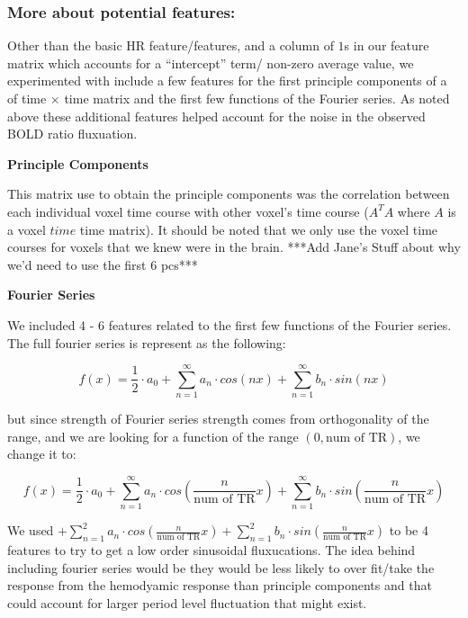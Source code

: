 \subsubsection{More about potential features:}
\par Other than the basic HR feature/features, and a column of $1$s in our feature matrix
which accounts for a ``intercept'' term/ non-zero average value, we experimented with 
include a few features for the first principle components of a of time $\times$ time 
matrix and the first few functions of the Fourier series.  As noted above these 
additional features helped account for the noise in the observed BOLD ratio 
fluxuation.

\vspace{2mm}
\textbf{Principle Components}
\vspace{2mm}
\par This matrix use to obtain the principle components was the correlation between 
each individual voxel time course with other voxel's time course ($A^TA$ where 
$A$ is a voxel $time$ time matrix). It should be noted that we only use the voxel 
time courses for voxels that we knew were in the brain. ***Add Jane's Stuff about 
why we'd need to use the first 6 pcs***

\vspace{2mm}
\textbf{Fourier Series}
\vspace{2mm}
\par We included 4 - 6 features related to the first few functions of the Fourier series.
The full fourier series is represent as the following:

\begin{equation}
f(x) = \frac{1}{2} \cdot a_0 + \sum_{n=1}^{\infty} a_n \cdot cos(n x) + \sum_{n=1}^{\infty} b_n \cdot  sin(n x)
\end{equation}

but since strength of Fourier series strength comes from orthogonality of the range, 
and we are looking for a function of the range $(0, \text{num of TR})$, we change it to:

\begin{equation}
f(x) = \frac{1}{2} \cdot a_0 + \sum_{n=1}^{\infty} a_n \cdot cos(\frac{n}{\text{num of TR}} x) + \sum_{n=1}^{\infty} b_n \cdot sin(\frac{n}{\text{num of TR}} x)
\end{equation}

We used $ + \sum_{n=1}^{2} a_n \cdot cos(\frac{n}{\text{num of TR}} x) + 
\sum_{n=1}^{2} b_n \cdot sin(\frac{n}{\text{num of TR}} x)$ to be 4 features to try 
to get a low order sinusoidal fluxucations. The idea behind including fourier series 
would be they would be less likely to over fit/take the response from the hemodyamic 
response than principle components and that could account for larger period level 
fluctuation that might exist.


